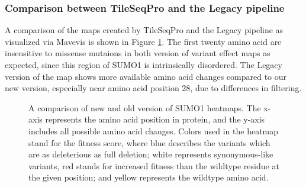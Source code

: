 \documentclass{article}
\begin{document}
\newpage


\subsubsection{Comparison between TileSeqPro and the Legacy pipeline}

A comparison of the maps created by TileSeqPro and the Legacy pipeline as visualized via Mavevis\cite{esposito_mavedb_2019} is shown in Figure \ref{fig:final map}. The first twenty amino acid are insensitive to missense mutaions in both version of variant effect maps as expected, since this region of SUMO1 is intrinsically disordered\cite{BAYER1998275}. The Legacy version of the map shows more available amino acid changes compared to our new version, especially near amino acid position 28, due to differences in filtering. 

\begin{figure}[H]%
    \centering
    \qquad
    \caption{A comparison of new and old version of SUMO1 heatmaps. The x-axis represents the amino acid position in protein, and the y-axis includes all possible amino acid changes. Colors used in the heatmap stand for the fitness score, where blue describes the variants which are as deleterious as full deletion; white represents synonymous-like variants, red stands for increased fitness than the wildtype residue at the given position; and yellow represents the wildtype amino acid.\cite{esposito_mavedb_2019}}%
    \label{fig:final map}%
\end{figure}
\end{document}

